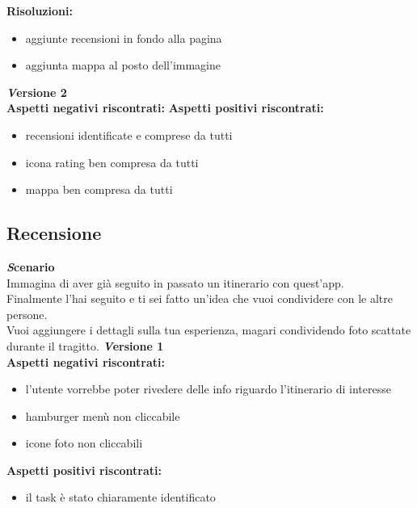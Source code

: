 \textbf{Risoluzioni:}
\begin{itemize}[label=-]

\item aggiunte recensioni in fondo alla pagina
\item aggiunta mappa al posto dell’immagine

\end{itemize}

\textbf{\emph Versione 2}\\
\textbf{Aspetti negativi riscontrati:}
\newline\newline
\textbf{Aspetti positivi riscontrati:}
\begin{itemize}[label=-]

\item recensioni identificate e comprese da tutti
\item icona rating ben compresa da tutti
\item mappa ben compresa da tutti

\end{itemize}


\subsection{Recensione}
\textbf{\emph Scenario}\\
Immagina di aver già seguito in passato un itinerario con quest'app.\\
Finalmente l'hai seguito e ti sei fatto un'idea che vuoi condividere con le altre
persone.\\
Vuoi aggiungere i dettagli sulla tua esperienza, magari condividendo foto scattate
durante il tragitto.
\newline
\textbf{\emph Versione 1}\\
\textbf{Aspetti negativi riscontrati:}
\begin{itemize}[label=-]

\item l'utente vorrebbe poter rivedere delle info riguardo l'itinerario di interesse
\item hamburger menù non cliccabile
\item icone foto non cliccabili

\end{itemize}

\textbf{Aspetti positivi riscontrati:}
\begin{itemize}[label=-]

\item il task è stato chiaramente identificato

\end{itemize}

